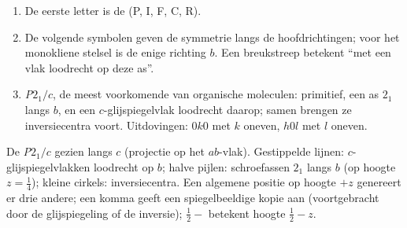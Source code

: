 \begin{method}\label{met:b3:x-ray-diffraction:read-space-group}
\begin{enumerate}
  \item De eerste letter is de  (P, I, F, C, R).
  \item De volgende symbolen geven de symmetrie langs de hoofdrichtingen;
        voor het monokliene stelsel is de enige richting $b$. Een breukstreep
        betekent ``met een vlak loodrecht op deze as''.
  \item \textit{P}$2_1/c$, de meest voorkomende  van organische
        moleculen: primitief, een as $2_1$ langs $b$, en een
        $c$-glijspiegelvlak loodrecht daarop; samen brengen ze
        inversiecentra voort. Uitdovingen: $0k0$ met $k$ oneven, $h0l$ met $l$
        oneven.
\end{enumerate}
\end{method}

\begin{omfigure}

{\small De  \textit{P}$2_1/c$ gezien langs $c$ (projectie op het
$ab$-vlak). Gestippelde lijnen: $c$-glijspiegelvlakken loodrecht op $b$;
halve pijlen: schroefassen $2_1$
langs $b$ (op hoogte $z = \frac14$); kleine cirkels: inversiecentra. Een
algemene positie op hoogte $+z$ genereert er drie andere; een komma geeft
een spiegelbeeldige kopie aan (voortgebracht door de glijspiegeling of de
inversie); $\frac12{-}$ betekent hoogte $\frac12 - z$.}
\end{omfigure}

